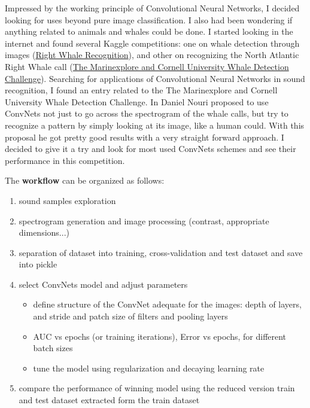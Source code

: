 \documentclass[]{article}
\newcommand{\competition}{The Marinexplore and Cornell University Whale Detection Challenge}
\begin{document}
Impressed by the working principle of Convolutional Neural Networks, I decided looking for uses beyond pure image classification. I also had been wondering if anything related to animals and whales could be done. I started looking in the internet and found several Kaggle competitions: one on whale detection through images (\href{https://www.kaggle.com/c/noaa-right-whale-recognition}{Right Whale Recognition}), and other on recognizing the North Atlantic Right Whale call (\href{https://www.kaggle.com/c/whale-detection-challenge}{\competition}). Searching for applications of Convolutional Neural Networks in sound recognition, I found an entry related to the \competition. In \cite{Nouriblog} Daniel Nouri proposed to use ConvNets not just to go across the spectrogram of the whale calls, but try to recognize a pattern by simply looking at its image, like a human could. With this proposal he got pretty good results with a very straight forward approach. I decided to give it a try and look for most used ConvNets schemes and see their performance in this competition.

The \textbf{workflow} can be organized as follows:
\begin{enumerate}
	\item sound samples exploration
	\item spectrogram generation and image processing (contrast, appropriate dimensions...)
	\item separation of dataset into training, cross-validation and test dataset and save into pickle 
	\item select ConvNets model and adjust parameters
	\begin{itemize}
		\item define structure of the ConvNet adequate for the images: depth of layers, and stride and patch size of filters and pooling layers
		\item AUC vs epochs (or training iterations), Error vs epochs, for different batch sizes
		\item tune the model using regularization and decaying learning rate		
	\end{itemize}
	\item compare the performance of winning model using the reduced version train and test dataset extracted form the train dataset
\end{enumerate}

\pagebreak
\end{document}
